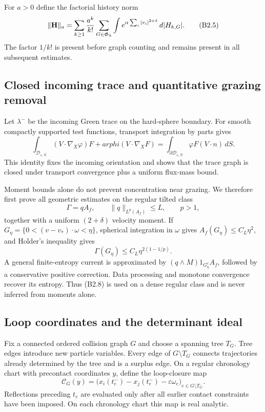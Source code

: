 For $a>0$ define the factorial history norm
\[
 \|\mathbf H\|_a
 =\sum_{k\ge1}{a^k\over k!}
   \sum_{G\in\mathfrak G_k}
   \int e^{\alpha\sum_i|v_i|^{2+\delta}}\,d|H_{k,G}| .   \tag{B2.5}
\]
The factor $1/k!$ is present before graph counting and remains present in all
subsequent estimates.

\subsection{Closed incoming trace and quantitative grazing removal}

Let $\lambda^-$ be the incoming Green trace on the hard-sphere boundary.
For smooth compactly supported test functions, transport integration by parts
gives
\[
 \int_{\mathcal D_{\varepsilon,N}}
 (V\cdot\nabla_X\varphi)F+arphi(V\cdot\nabla_XF)
 =\int_{\partial\mathcal D_{\varepsilon,N}}
   \varphi F(V\cdot n)\,dS .                             \tag{B2.6}
\]
This identity fixes the incoming orientation and shows that the trace graph is
closed under transport convergence plus a uniform flux-mass bound.

Moment bounds alone do not prevent concentration near grazing.  We therefore
first prove all geometric estimates on the regular tilted class
\[
 \Gamma=qA_f,\qquad
 \|q\|_{L^p(A_f)}\le L,\qquad p>1,                       \tag{B2.7}
\]
together with a uniform $(2+\delta)$ velocity moment.  If
$G_\eta=\{0<(v-v_*)\cdot\omega<\eta\}$, spherical integration in $\omega$
gives $A_f(G_\eta)\le C_L\eta^2$, and Holder's inequality gives
\[
 \Gamma(G_\eta)
 \le C_L\eta^{2(1-1/p)}.                                \tag{B2.8}
\]
A general finite-entropy current is approximated by
$(q\wedge M)1_{G_\eta^c}A_f$, followed by a conservative positive correction.
Data processing and monotone convergence recover its entropy.  Thus (B2.8) is
used on a dense regular class and is never inferred from moments alone.

\subsection{Loop coordinates and the determinant ideal}

Fix a connected ordered collision graph $G$ and choose a spanning tree $T_G$.
Tree edges introduce new particle variables.  Every edge of
$G\setminus T_G$ connects trajectories already determined by the tree and is
a surplus edge.  On a regular chronology chart with precontact coordinates
$y$, define the loop-closure map
\[
 \mathcal C_G(y)
 =\bigl(x_i(t_e^-)-x_j(t_e^-)-\varepsilon\omega_e
       \bigr)_{e\in G\setminus T_G}.                     \tag{B2.9}
\]
Reflections preceding $t_e$ are evaluated only after all earlier contact
constraints have been imposed.  On each chronology chart this map is real
analytic.

